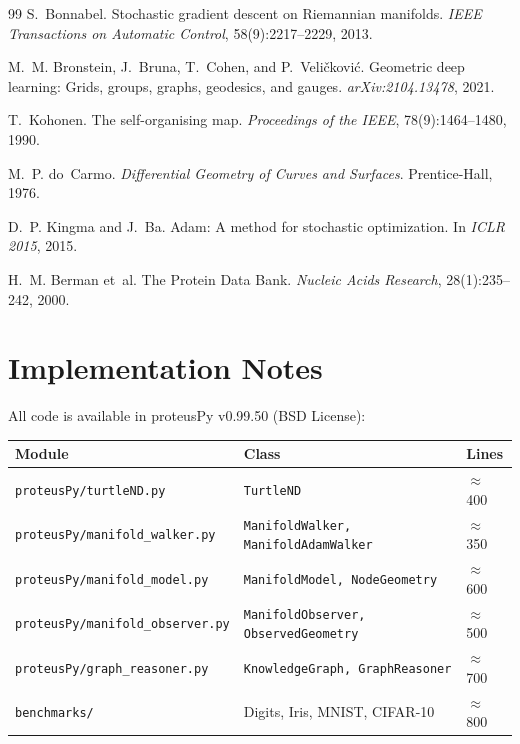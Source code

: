 \documentclass[12pt,letterpaper]{article}
\begin{document}
\begin{thebibliography}{99}
S.~Bonnabel.
\newblock Stochastic gradient descent on {Riemannian} manifolds.
\newblock \emph{IEEE Transactions on Automatic Control}, 58(9):2217--2229, 2013.

M.~M. Bronstein, J.~Bruna, T.~Cohen, and P.~Veli\v{c}kovi\'{c}.
\newblock Geometric deep learning: Grids, groups, graphs, geodesics, and
  gauges.
\newblock \emph{arXiv:2104.13478}, 2021.

T.~Kohonen.
\newblock The self-organising map.
\newblock \emph{Proceedings of the IEEE}, 78(9):1464--1480, 1990.

M.~P. do~Carmo.
\newblock \emph{Differential Geometry of Curves and Surfaces}.
\newblock Prentice-Hall, 1976.

D.~P. Kingma and J.~Ba.
\newblock Adam: A method for stochastic optimization.
\newblock In \emph{ICLR 2015}, 2015.

H.~M. Berman et~al.
\newblock The {Protein Data Bank}.
\newblock \emph{Nucleic Acids Research}, 28(1):235--242, 2000.

\end{thebibliography}

\appendix
\section{Implementation Notes}

All code is available in proteusPy v0.99.50 (BSD License):

\begin{table}[h]
\centering
\begin{tabular}{lll}
\toprule
Module & Class & Lines \\
\midrule
\texttt{proteusPy/turtleND.py}          & \texttt{TurtleND}                         & $\approx$400 \\
\texttt{proteusPy/manifold\_walker.py}  & \texttt{ManifoldWalker, ManifoldAdamWalker} & $\approx$350 \\
\texttt{proteusPy/manifold\_model.py}   & \texttt{ManifoldModel, NodeGeometry}      & $\approx$600 \\
\texttt{proteusPy/manifold\_observer.py}& \texttt{ManifoldObserver, ObservedGeometry} & $\approx$500 \\
\texttt{proteusPy/graph\_reasoner.py}   & \texttt{KnowledgeGraph, GraphReasoner}    & $\approx$700 \\
\texttt{benchmarks/}                    & Digits, Iris, MNIST, CIFAR-10             & $\approx$800 \\
\bottomrule
\end{tabular}
\end{table}
\end{document}
